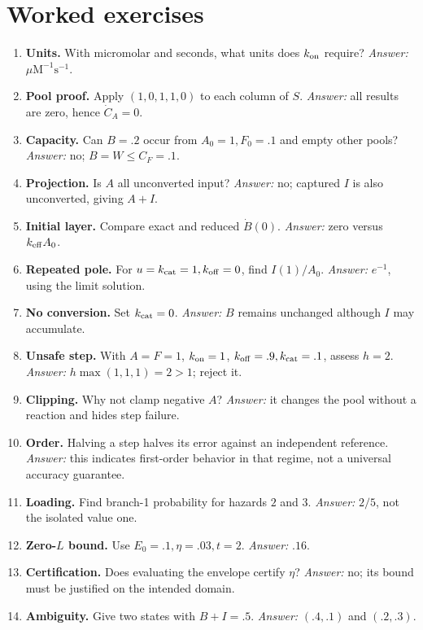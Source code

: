 \section{Worked exercises}
\begin{enumerate}
\item \textbf{Units.} With micromolar and seconds, what units does $k_{\rm on}$
require? \emph{Answer:} $\mu\mathrm M^{-1}\mathrm s^{-1}$.
\item \textbf{Pool proof.} Apply $(1,0,1,1,0)$ to each column of $S$.
\emph{Answer:} all results are zero, hence $\dot C_A=0$.
\item \textbf{Capacity.} Can $B=.2$ occur from $A_0=1,F_0=.1$ and empty
other pools? \emph{Answer:} no; $B=W\le C_F=.1$.
\item \textbf{Projection.} Is $A$ all unconverted input?
\emph{Answer:} no; captured $I$ is also unconverted, giving $A+I$.
\item \textbf{Initial layer.} Compare exact and reduced $\dot B(0)$.
\emph{Answer:} zero versus $k_{\rm eff}A_0$.
\item \textbf{Repeated pole.} For $u=k_{\rm cat}=1,k_{\rm off}=0$, find
$I(1)/A_0$. \emph{Answer:} $e^{-1}$, using the limit solution.
\item \textbf{No conversion.} Set $k_{\rm cat}=0$.
\emph{Answer:} $B$ remains unchanged although $I$ may accumulate.
\item \textbf{Unsafe step.} With $A=F=1$, $k_{\rm on}=1$,
$k_{\rm off}=.9,k_{\rm cat}=.1$, assess $h=2$.
\emph{Answer:} $h\max(1,1,1)=2>1$; reject it.
\item \textbf{Clipping.} Why not clamp negative $A$?
\emph{Answer:} it changes the pool without a reaction and hides step failure.
\item \textbf{Order.} Halving a step halves its error against an independent
reference. \emph{Answer:} this indicates first-order behavior in that regime,
not a universal accuracy guarantee.
\item \textbf{Loading.} Find branch-1 probability for hazards $2$ and $3$.
\emph{Answer:} $2/5$, not the isolated value one.
\item \textbf{Zero-$L$ bound.} Use $E_0=.1,\eta=.03,t=2$.
\emph{Answer:} $.16$.
\item \textbf{Certification.} Does evaluating the envelope certify $\eta$?
\emph{Answer:} no; its bound must be justified on the intended domain.
\item \textbf{Ambiguity.} Give two states with $B+I=.5$.
\emph{Answer:} $(.4,.1)$ and $(.2,.3)$.

\end{enumerate}
